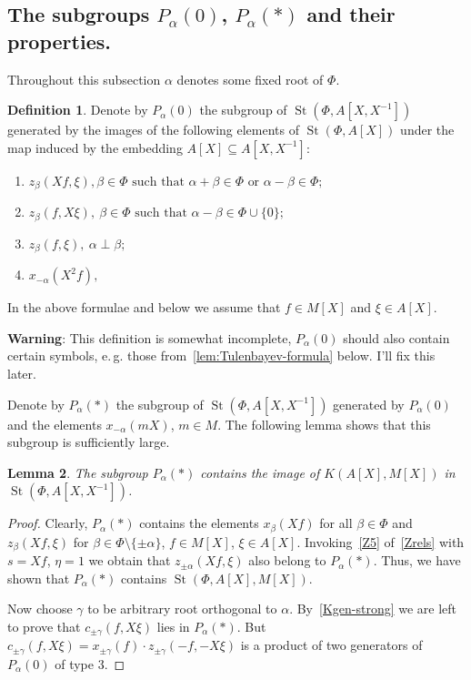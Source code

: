 \documentclass[oneside, 8pt]{amsart}
\newtheorem{lemma}{Lemma}
\theoremstyle{remark}
\theoremstyle{definition}
\newtheorem{df}[lemma]{Definition} \Crefname{df}{Definition}{Definitions}
\DeclareMathOperator{\St}{St}
\numberwithin{equation}{section}
\begin{document}
\subsection{The subgroups $P_\alpha(0)$, $P_\alpha(*)$ and their properties.} Throughout this subsection $\alpha$ denotes some fixed root of $\Phi$.
\begin{df} \label{defP0}
Denote by $P_\alpha(0)$ the subgroup of $\St(\Phi, A[X, X^{-1}])$ generated by the images of the following elements of $\St(\Phi, A[X])$ under the
 map induced by the embedding $A[X] \subseteq A[X, X^{-1}]$:
\begin{enumerate}
 \item $z_{\beta}(Xf, \xi), \beta \in \Phi \text{ such that }\alpha + \beta \in \Phi\text{ or } \alpha - \beta \in \Phi;$
 \item $z_{\beta}(f, X\xi),\ \beta \in \Phi \text{ such that }\alpha - \beta \in \Phi \cup \{0\};$
 \item $z_{\beta}(f, \xi),\ \alpha \perp \beta;$
 \item $x_{-\alpha}(X^2f),$
\end{enumerate}
In the above formulae and below we assume that $f \in M[X]$ and $\xi \in A[X]$. \end{df}

{\bf Warning}: This definition is somewhat incomplete, $P_\alpha(0)$ should also contain certain symbols, e.\,g. those from~\cref{lem:Tulenbayev-formula} below. 
I'll fix this later.

Denote by $P_\alpha(*)$ the subgroup of $\St(\Phi, A[X, X^{-1}])$ generated by $P_\alpha(0)$ and the elements $x_{-\alpha}(mX)$, $m \in M$. The following lemma shows that this subgroup is sufficiently large.
\begin{lemma} \label{Pstar-large} The subgroup $P_\alpha(*)$ contains the image of $K(A[X], M[X])$ in $\St(\Phi, A[X, X^{-1}])$. \end{lemma}
\begin{proof} Clearly, $P_\alpha(*)$ contains the elements $x_\beta(Xf)$ for all $\beta \in \Phi$ and $z_\beta(Xf, \xi)$ for $\beta \in \Phi \setminus \{\pm \alpha\}$, $f \in M[X]$, $\xi\in A[X]$. 
Invoking~\eqref{Z5} of~\cref{Zrels} with $s = Xf$, $\eta = 1$ we obtain that $z_{\pm\alpha}(Xf, \xi)$ also belong to $P_{\alpha}(*)$. Thus, we have shown that $P_\alpha(*)$ contains $\St(\Phi, A[X], M[X])$.

Now choose $\gamma$ to be arbitrary root orthogonal to $\alpha$. By~\cref{Kgen-strong} we are left to prove that $c_{\pm \gamma}(f, X\xi)$ lies in $P_\alpha(*)$. 
But $c_{\pm \gamma}(f, X\xi) = x_{\pm \gamma}(f) \cdot z_{\pm \gamma}(-f, -X\xi)$ is a product of two generators of $P_\alpha(0)$ of type 3. \end{proof}
\end{document}
